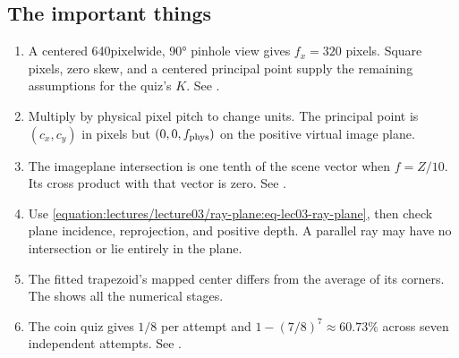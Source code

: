 \documentclass[letterpaper,11pt,english,openany,oneside]{jupyterBook}
\begin{document}
\subsection{The important things}
\label{\detokenize{lectures/lecture03/tldr:the-important-things}}\begin{enumerate}
%
\item {}
\sphinxAtStartPar
{} A centered 640\sphinxhyphen{}pixel\sphinxhyphen{}wide, 90° pinhole view gives \(f_x=320\) pixels. Square pixels, zero skew, and a centered principal point supply the remaining assumptions for the quiz’s \(K\). See {\hyperref[\detokenize{lectures/lecture03/calibration::doc}]{}}.

\item {}
\sphinxAtStartPar
{} Multiply by physical pixel pitch to change units. The principal point is \((c_x,c_y)\) in pixels but \((0,0,f_{\rm phys})\) on the positive virtual image plane.

\item {}
\sphinxAtStartPar
{} The image\sphinxhyphen{}plane intersection is one tenth of the scene vector when \(f=Z/10\). Its cross product with that vector is zero. See {\hyperref[\detokenize{lectures/lecture03/ray-plane::doc}]{}}.

\item {}
\sphinxAtStartPar
{} Use \eqref{equation:lectures/lecture03/ray-plane:eq-lec03-ray-plane}, then check plane incidence, reprojection, and positive depth. A parallel ray may have no intersection or lie entirely in the plane.

\item {}
\sphinxAtStartPar
{} The fitted trapezoid’s mapped center differs from the average of its corners. The {\hyperref[\detokenize{lectures/lecture03/homography-practice::doc}]{}} shows all the numerical stages.

\item {}
\sphinxAtStartPar
{} The coin quiz gives \(1/8\) per attempt and \(1-(7/8)^7\approx60.73\%\) across seven independent attempts. See {\hyperref[\detokenize{lectures/lecture03/probability-ransac::doc}]{}}.


\end{enumerate}
\end{document}

